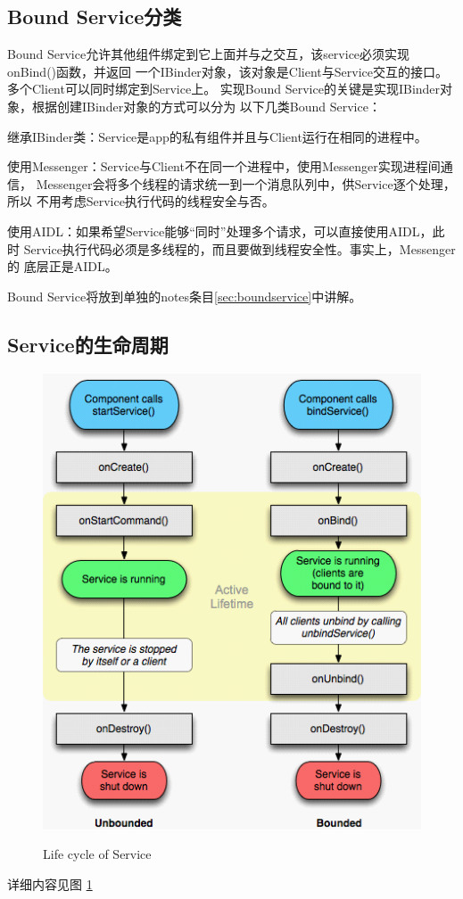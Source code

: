 ﻿\documentclass[a4paper,11pt]{article}
\begin{document}
  \subsection[Bound Service分类]{Bound Service分类}
  Bound Service允许其他组件绑定到它上面并与之交互，该service必须实现onBind()函数，并返回
  一个IBinder对象，该对象是Client与Service交互的接口。多个Client可以同时绑定到Service上。
  实现Bound Service的关键是实现IBinder对象，根据创建IBinder对象的方式可以分为
  以下几类Bound Service：\par
  \begin{coloredenumerate}
    \item 继承IBinder类：Service是app的私有组件并且与Client运行在相同的进程中。
    \item 使用Messenger：Service与Client不在同一个进程中，使用Messenger实现进程间通信，
          Messenger会将多个线程的请求统一到一个消息队列中，供Service逐个处理，所以
          不用考虑Service执行代码的线程安全与否。
    \item 使用AIDL：如果希望Service能够“同时”处理多个请求，可以直接使用AIDL，此时
          Service执行代码必须是多线程的，而且要做到线程安全性。事实上，Messenger的
          底层正是AIDL。
  \end{coloredenumerate}
  Bound Service将放到单独的notes条目\ref{sec:boundservice}中讲解。

  \subsection[Service的生命周期]{Service的生命周期}
  \begin{figure}[ht]
    \centering
    \includegraphics[width=.7\textwidth]{life_cycle_of_service.png}\\
    \caption{Life cycle of Service}\label{fig:service}
  \end{figure}
  详细内容见图 \ref{fig:service}
\end{document}
